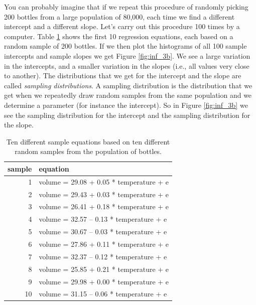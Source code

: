 \documentclass[]{book}\usepackage[]{graphicx}\usepackage[]{color}
\begin{document}
You can probably imagine that if we repeat this procedure of randomly picking 200 bottles from a large population of 80,000, each time we find a different intercept and a different slope. Let's carry out this procedure 100 times by a computer. Table \ref{tab:inf_3a} shows the first 10 regression equations, each based on a random sample of 200 bottles. If we then plot the histograms of all 100 sample intercepts and sample slopes we get Figure \ref{fig:inf_3b}. We see a large variation in the intercepts, and a smaller variation in the slopes (i.e., all values very close to another). The distributions that we get for the intercept and the slope are called \textit{sampling distributions}. A sampling distribution is the distribution that we get when we repeatedly draw random samples from the same population and we determine a parameter (for instance the intercept). So in Figure \ref{fig:inf_3b} we see the sampling distribution for the intercept and the sampling distribution for the slope. 




\begin{table}[ht]
\centering
\caption{Ten different sample equations based on ten different random samples from the population of bottles.} 
\label{tab:inf_3a}
\begin{tabular}{rl}
  \hline
sample & equation \\ 
  \hline
1 & volume =  29.08  +  0.05 * temperature + e \\ 
  2 & volume =  29.43  +  0.03 * temperature + e \\ 
  3 & volume =  26.41  +  0.18 * temperature + e \\ 
  4 & volume =  32.57  --  0.13 * temperature + e \\ 
  5 & volume =  30.67  --  0.03 * temperature + e \\ 
  6 & volume =  27.86  +  0.11 * temperature + e \\ 
  7 & volume =  32.37  --  0.12 * temperature + e \\ 
  8 & volume =  25.85  +  0.21 * temperature + e \\ 
  9 & volume =  29.98  +  0.00 * temperature + e \\ 
  10 & volume =  31.15  --  0.06 * temperature + e \\ 
   \hline
\end{tabular}
\end{table}
\end{document}
